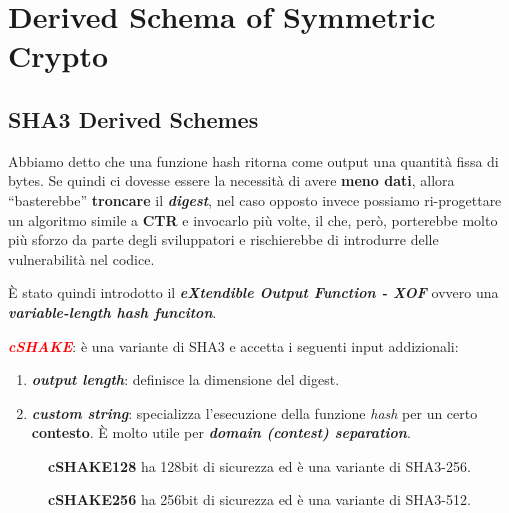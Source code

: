 \chapter{Derived Schema of Symmetric Crypto}

\section{SHA3 Derived Schemes}
\begin{flushleft}

    Abbiamo detto che una funzione hash ritorna come output una quantità fissa di bytes. Se quindi ci dovesse essere la necessità di avere \textbf{meno dati}, allora ``basterebbe'' \textbf{troncare} il \textbf{\textit{digest}}, nel caso opposto invece possiamo ri-progettare un algoritmo simile a \textbf{CTR} e invocarlo più volte, il che, però, porterebbe molto più sforzo da parte degli sviluppatori e rischierebbe di introdurre delle vulnerabilità nel codice.
    
    \smallskip

    È stato quindi introdotto il \textbf{\textit{eXtendible Output Function - XOF}} ovvero una \textbf{\textit{variable-length hash funciton}}.

    \smallskip

    \textcolor{red}{\textbf{\textit{cSHAKE}}}: è una variante di SHA3 e accetta i seguenti input addizionali:
    \begin{enumerate}[nosep]
        \item \textbf{\textit{output length}}: definisce la dimensione del digest.
        \item \textbf{\textit{custom string}}: specializza l'esecuzione della funzione \textit{hash} per un certo \textbf{contesto}. È molto utile per \textbf{\textit{domain (contest) separation}}.
    \end{enumerate}

    \begin{figure}[h]
        \centering
        \begin{minipage}[c]{0.45\textwidth}
            \textbf{cSHAKE128} ha 128bit di sicurezza ed è una variante di SHA3-256.
        \end{minipage}
        \hfill
        \begin{minipage}[c]{0.45\textwidth}
            \textbf{cSHAKE256} ha 256bit di sicurezza ed è una variante di SHA3-512.
        \end{minipage}
    \end{figure}


\end{flushleft}
